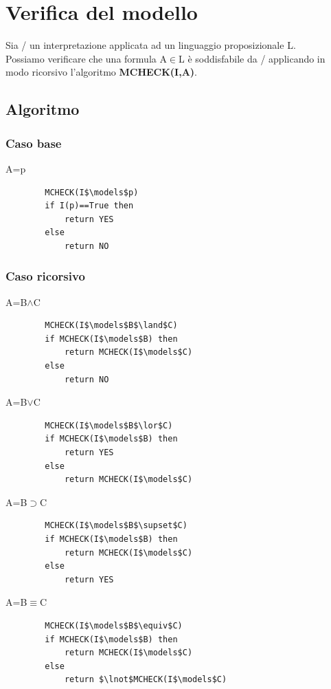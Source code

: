 \documentclass[../main.tex]{subfiles}
\begin{document}
    \section{Verifica del modello}
    Sia / un interpretazione applicata ad un linguaggio proposizionale L.\\
    Possiamo verificare che una formula A$\in$L è soddisfabile da / applicando in modo ricorsivo l'algoritmo \textbf{MCHECK(I,A)}.

    \subsection{Algoritmo}
    \subsubsection{Caso base}
    A=p
    \begin{lstlisting}
        MCHECK(I$\models$p)
        if I(p)==True then
            return YES
        else
            return NO
    \end{lstlisting}

    \subsubsection{Caso ricorsivo}
    A=B$\land$C
    \begin{lstlisting}
        MCHECK(I$\models$B$\land$C)
        if MCHECK(I$\models$B) then
            return MCHECK(I$\models$C)
        else
            return NO
    \end{lstlisting}

    \noindent
    A=B$\lor$C
    \begin{lstlisting}
        MCHECK(I$\models$B$\lor$C)
        if MCHECK(I$\models$B) then
            return YES
        else
            return MCHECK(I$\models$C)
    \end{lstlisting}

    \noindent
    A=B$\supset$C
    \begin{lstlisting}
        MCHECK(I$\models$B$\supset$C)
        if MCHECK(I$\models$B) then
            return MCHECK(I$\models$C)
        else
            return YES
    \end{lstlisting}

    \noindent
    A=B$\equiv$C
    \begin{lstlisting}
        MCHECK(I$\models$B$\equiv$C)
        if MCHECK(I$\models$B) then
            return MCHECK(I$\models$C)
        else
            return $\lnot$MCHECK(I$\models$C)
    \end{lstlisting}
\end{document}
